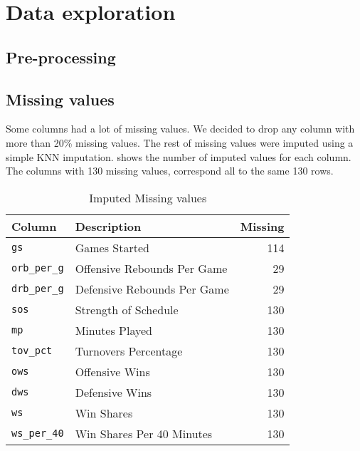 
\section{Data exploration}%
\label{sec:data-exploration}

\subsection{Pre-processing}%
\label{sub:pre-processing}

\subsection{Missing values}%
\label{sub:missing-values}

Some columns had a lot of missing values. We decided to drop any column with
more than 20\% missing values. The rest of missing values were imputed using a
simple KNN imputation.  shows the number of imputed
values for each column. The columns with 130 missing values, correspond all to
the same 130 rows.

\begin{table}[htb]
  \centering
  \caption{Imputed Missing values}%
  \label{tab:missing-values}
  \begin{tabular}{llr}
    \toprule
    \textbf{Column} & \textbf{Description} & \textbf{Missing} \\
    \midrule
    \texttt{gs}          & Games Started               & 114 \\
    \texttt{orb\_per\_g} & Offensive Rebounds Per Game & 29  \\
    \texttt{drb\_per\_g} & Defensive Rebounds Per Game & 29  \\
    \texttt{sos}         & Strength of Schedule        & 130 \\
    \texttt{mp}          & Minutes Played              & 130 \\
    \texttt{tov\_pct}    & Turnovers Percentage        & 130 \\
    \texttt{ows}         & Offensive Wins              & 130 \\
    \texttt{dws}         & Defensive Wins              & 130 \\
    \texttt{ws}          & Win Shares                  & 130 \\
    \texttt{ws\_per\_40} & Win Shares Per 40 Minutes   & 130 \\
    \bottomrule
  \end{tabular}
\end{table}

